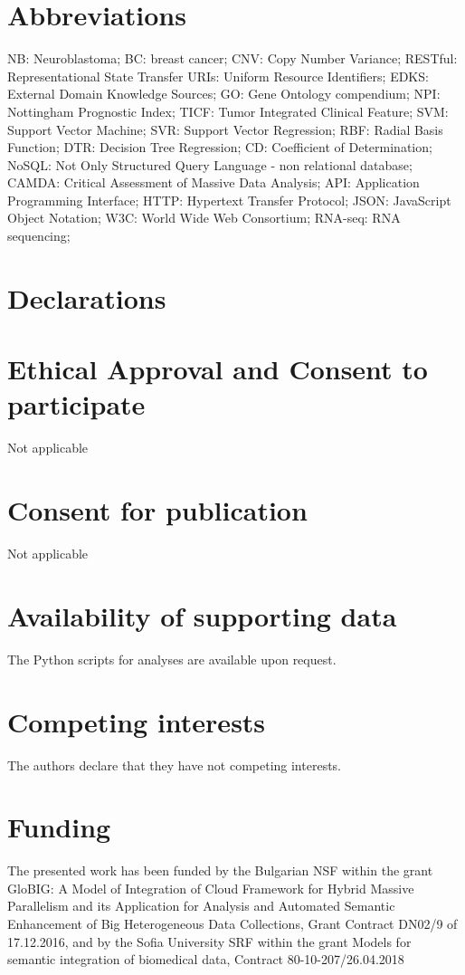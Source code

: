 \documentclass{bmcart}
\begin{document}

\begin{backmatter}

\section*{Abbreviations}
NB: Neuroblastoma; BC: breast cancer; CNV: Copy Number Variance; RESTful: Representational State Transfer
URIs: Uniform Resource Identifiers;  EDKS: External Domain Knowledge Sources; GO: Gene Ontology compendium;
NPI: Nottingham Prognostic Index;  TICF: Tumor Integrated Clinical Feature;  SVM: Support Vector Machine;
SVR: Support Vector Regression; RBF: Radial Basis Function; DTR: Decision Tree Regression; CD: Coefficient of Determination;
NoSQL: Not Only Structured Query Language - non relational database; CAMDA: Critical Assessment of Massive Data Analysis;
API: Application Programming Interface; HTTP: Hypertext Transfer Protocol; JSON:  JavaScript Object Notation;
W3C:  World Wide Web Consortium; RNA-seq: RNA sequencing;

\section*{Declarations}

\section*{Ethical Approval and Consent to participate}
Not applicable
\section*{Consent for publication}
Not applicable
\section*{Availability of supporting data}
The Python scripts for analyses are available upon request.
\section*{Competing interests}
The authors declare that they have not competing interests.
\section*{Funding}
The presented work has been funded by the Bulgarian NSF within the grant GloBIG: A
Model of Integration of Cloud Framework for Hybrid Massive Parallelism and its Application
for Analysis and Automated Semantic Enhancement of Big Heterogeneous Data Collections,
Grant Contract DN02/9 of 17.12.2016, and by the Sofia University SRF within the grant
Models for semantic integration of biomedical data, Contract 80-10-207/26.04.2018


\end{backmatter}
\end{document}
